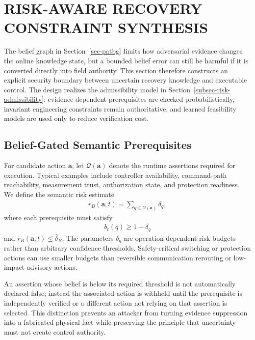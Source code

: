 \section{RISK-AWARE RECOVERY CONSTRAINT SYNTHESIS}
\label{sec-risk-synthesis}
The belief graph in Section~\ref{sec-patbg} limits how adversarial evidence changes the online knowledge state, but a bounded belief error can still be harmful if it is converted directly into field authority. This section therefore constructs an explicit security boundary between uncertain recovery knowledge and executable control. The design realizes the admissibility model in Section~\ref{subsec-risk-admissibility}: evidence-dependent prerequisites are checked probabilistically, invariant engineering constraints remain authoritative, and learned feasibility models are used only to reduce verification cost.

\subsection{Belief-Gated Semantic Prerequisites}
For candidate action $\mathbf{a}$, let $\mathcal{Q}(\mathbf{a})$ denote the runtime assertions required for execution. Typical examples include controller availability, command-path reachability, measurement trust, authorization state, and protection readiness. We define the semantic risk estimate
\begin{align}
\label{eq-action-semantic-risk}
r_B(\mathbf{a},t)=\sum_{q\in\mathcal{Q}(\mathbf{a})}\delta_q,
\end{align}
where each prerequisite must satisfy
\begin{align}
\label{eq-action-belief-test}
b_t(q)\ge 1-\delta_q
\end{align}
and $r_B(\mathbf{a},t)\le\bar\delta_B$. The parameters $\delta_q$ are operation-dependent risk budgets rather than arbitrary confidence thresholds. Safety-critical switching or protection actions can use smaller budgets than reversible communication rerouting or low-impact advisory actions.

An assertion whose belief is below its required threshold is not automatically declared false; instead the associated action is withheld until the prerequisite is independently verified or a different action not relying on that assertion is selected. This distinction prevents an attacker from turning evidence suppression into a fabricated physical fact while preserving the principle that uncertainty must not create control authority.

